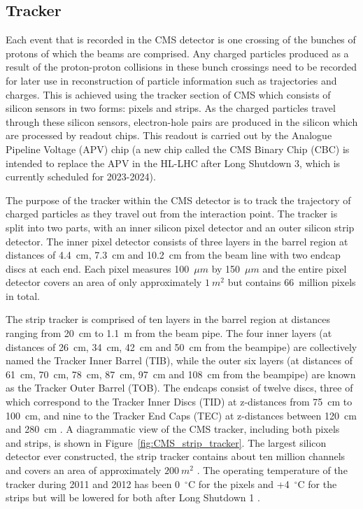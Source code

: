 \subsection{Tracker}
\label{ss:Tracker}

Each event that is recorded in the CMS detector is one crossing of the bunches of protons of which the beams
are comprised. Any charged particles produced as a result of the proton-proton collisions in these bunch
crossings need to be recorded for later use in reconstruction of particle information such as trajectories and
charges. This is achieved using the tracker section of CMS which consists of silicon sensors in two forms:
pixels and strips. As the charged particles travel through these silicon sensors, electron-hole pairs are
produced in the silicon which are processed by readout chips. This readout is carried out by the
Analogue Pipeline Voltage (APV) chip (a new chip called the CMS Binary Chip (CBC) is intended to replace
the APV in the HL-LHC after Long Shutdown 3, which is currently scheduled for 2023-2024).

The purpose of the tracker within the CMS detector is to track the trajectory of charged particles as they
travel out from the interaction point. The tracker is split into two parts, with an inner silicon pixel
detector and an outer silicon strip detector. The inner pixel detector consists of three layers in the
barrel region at distances of 4.4~cm, 7.3~cm and 10.2~cm from the beam line with two endcap discs at each end.
Each pixel measures 100~$\mu m$ by 150~$\mu m$ and the entire pixel detector covers an area of only
approximately $1~m^{2}$ but contains 66~million pixels in total.

The strip tracker is comprised of ten layers in the barrel region at distances ranging from 20~cm to 1.1~m
from the beam pipe. The four inner layers (at distances of 26~cm, 34~cm, 42~cm and 50~cm from the beampipe)
are collectively named the Tracker Inner Barrel (TIB), while the outer six layers (at distances of 61~cm,
70~cm, 78~cm, 87~cm, 97~cm and 108~cm from the beampipe) are known as the Tracker Outer Barrel (TOB). The
endcaps consist of twelve discs, three of which correspond to the Tracker Inner Discs (TID) at z-distances
from 75~cm to 100~cm, and nine to the Tracker End Caps (TEC) at z-distances between 120~cm and 280~cm
\cite{Palmonari:1260970}. A diagrammatic view of the CMS tracker, including both pixels and strips, is shown
in Figure~\ref{fig:CMS_strip_tracker}. The largest silicon detector ever constructed, the strip tracker
contains about ten million channels and covers an area of approximately $200~m^{2}$
\cite{CMS_experiment,CMS_TDR1}. The operating temperature of the tracker during 2011 and 2012 has been
0~$^{\circ}$C for the pixels and +4~$^{\circ}$C for the strips but will be lowered for both after Long
Shutdown 1 \cite{Butz:1497745}.

